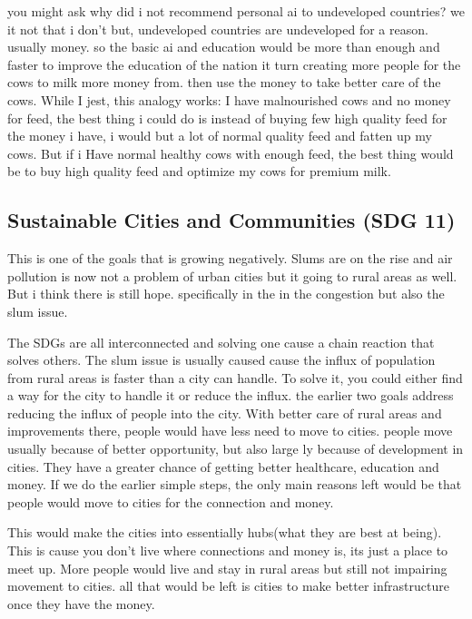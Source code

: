 you might ask why did i not recommend personal ai to undeveloped countries? we it not that i don't but, undeveloped countries are undeveloped for a reason. usually money. so the basic ai and education would be more than enough and faster to improve the education of the nation it turn creating more people for the cows to milk more money from. then use the money to take better care of the cows. While I jest, this analogy works:
I have malnourished cows and no money for feed, the best thing i could do is instead of buying few high quality feed for the money i have, i would but a lot of normal quality feed and fatten up my cows.
But if i Have normal healthy cows with enough feed, the best thing would be to buy high quality feed and optimize my cows for premium milk.
\subsection{Sustainable Cities and Communities (SDG 11)}
This is one of the goals that is growing negatively. Slums are on the rise and air pollution is now not a problem of urban cities but it going to rural areas as well. But i think there is still hope. specifically in the in the congestion but also the slum issue.

The SDGs are all interconnected and solving one cause a chain reaction that solves others.  The slum issue is usually caused cause the influx of population from rural areas is faster than a city can handle. To solve it, you could either find a way for the city to handle it or reduce the influx. the earlier two goals address reducing the influx of people into the city. With better care of rural areas and improvements there, people would have less need to move to cities. people move usually because of better opportunity, but also large ly because of development in cities. They have a greater chance of getting better healthcare, education and money. If we do the earlier simple steps, the only main reasons left would be that people would move to cities for the connection and money. 

This would make the cities into essentially hubs(what they are best at being). This is cause you don't live where connections and money is, its just a place to meet up. More people would live and stay in rural areas but still not impairing movement to cities. all that would be left is cities to make better infrastructure once they have the money.

